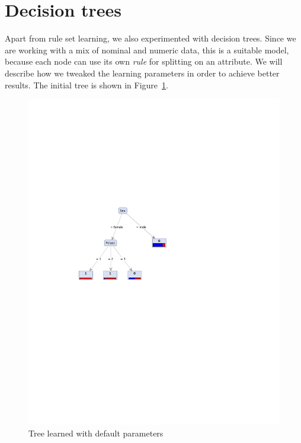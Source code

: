 \documentclass[11pt,a4paper]{article}
\begin{document}
\section{Decision trees}

Apart from rule set learning, we also experimented with decision trees. Since we are working with a mix of nominal and numeric data, this is a suitable model, because each node can use its own \emph{rule} for splitting on an attribute. We will describe how we tweaked the learning parameters in order to achieve better results. The initial tree is shown in Figure~\ref{fig:tree_initial}.


\begin{figure}[htbp]
  \centering
  \includegraphics[width = .6\textwidth]{tree_initial}
  \captionsetup{width=.8\textwidth}
  \caption{Tree learned with default parameters}
  \label{fig:tree_initial}
\end{figure}
\end{document}
